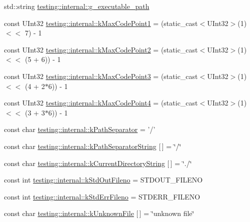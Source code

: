 \begin{DoxyCompactItemize}
\item 
std\-::string \hyperlink{namespacetesting_1_1internal_a378aeb636e57d85615c466189e84417b}{testing\-::internal\-::g\-\_\-executable\-\_\-path}
\item 
const U\-Int32 \hyperlink{namespacetesting_1_1internal_a128515c8ed6c0fe98e498c8042da2060}{testing\-::internal\-::k\-Max\-Code\-Point1} = (static\-\_\-cast$<$U\-Int32$>$(1) $<$$<$ 7) -\/ 1
\item 
const U\-Int32 \hyperlink{namespacetesting_1_1internal_ab8f4a5ed784352f00342cfeadc72337e}{testing\-::internal\-::k\-Max\-Code\-Point2} = (static\-\_\-cast$<$U\-Int32$>$(1) $<$$<$ (5 + 6)) -\/ 1
\item 
const U\-Int32 \hyperlink{namespacetesting_1_1internal_aa42bd507418e570402996e33582beed3}{testing\-::internal\-::k\-Max\-Code\-Point3} = (static\-\_\-cast$<$U\-Int32$>$(1) $<$$<$ (4 + 2$\ast$6)) -\/ 1
\item 
const U\-Int32 \hyperlink{namespacetesting_1_1internal_acd87c60be9b5fedb2d017503d8834474}{testing\-::internal\-::k\-Max\-Code\-Point4} = (static\-\_\-cast$<$U\-Int32$>$(1) $<$$<$ (3 + 3$\ast$6)) -\/ 1
\item 
const char \hyperlink{namespacetesting_1_1internal_afcd71adaa9d1e6df7b282a17fc48125c}{testing\-::internal\-::k\-Path\-Separator} = '/'
\item 
const char \hyperlink{namespacetesting_1_1internal_a3ba2f5fb9e3fd5085cf75beddc381e1d}{testing\-::internal\-::k\-Path\-Separator\-String} \mbox{[}$\,$\mbox{]} = \char`\"{}/\char`\"{}
\item 
const char \hyperlink{namespacetesting_1_1internal_af0c1ffec2a97f6094e956d46c07f0b5d}{testing\-::internal\-::k\-Current\-Directory\-String} \mbox{[}$\,$\mbox{]} = \char`\"{}./\char`\"{}
\item 
const int \hyperlink{namespacetesting_1_1internal_a24f0a3d50cac54a9132f4828ec9b96d9}{testing\-::internal\-::k\-Std\-Out\-Fileno} = S\-T\-D\-O\-U\-T\-\_\-\-F\-I\-L\-E\-N\-O
\item 
const int \hyperlink{namespacetesting_1_1internal_a747eccfdbdee3ff8af3bedc476a57c85}{testing\-::internal\-::k\-Std\-Err\-Fileno} = S\-T\-D\-E\-R\-R\-\_\-\-F\-I\-L\-E\-N\-O
\item 
const char \hyperlink{namespacetesting_1_1internal_ae16ec72cbaf31c1b9a5abf9be4478c5b}{testing\-::internal\-::k\-Unknown\-File} \mbox{[}$\,$\mbox{]} = \char`\"{}unknown file\char`\"{}
\end{DoxyCompactItemize}


